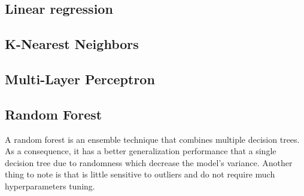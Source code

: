 \subsection{Linear regression}

\subsection{K-Nearest Neighbors}

\subsection{Multi-Layer Perceptron}

\subsection{Random Forest}

A random forest is an ensemble technique that combines multiple decision trees. As a consequence, it has a better generalization performance that a single decision tree due to randomness which decrease the model's variance. Another thing to note is that is little sensitive to outliers and do not require much hyperparameters tuning.
